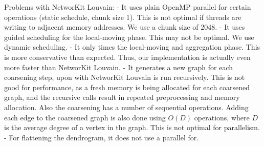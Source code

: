 Problems with NetworKit Louvain:
- It uses plain OpenMP parallel for certain operations (static schedule, chunk size 1). This is not optimal if threads are writing to adjacent memory addresses. We use a chunk size of 2048.
- It uses guided scheduling for the local-moving phase. This may not be optimal. We use dynamic scheduling.
- It only times the local-moving and aggregation phase. This is more conservative than expected. Thus, our implementation is actually even more faster than NetworKit Louvain.
- It generates a new graph for each coarsening step, upon with NetworKit Louvain is run recursively. This is not good for performance, as a fresh memory is being allocated for each coarsened graph, and the recursive calls result in repeated preprocessing and memory allocation. Also the coarsening has a number of sequential operations. Adding each edge to the coarsened graph is also done using $O(D)$ operations, where $D$ is the average degree of a vertex in the graph. This is not optimal for parallelism.
- For flattening the dendrogram, it does not use a parallel for.
